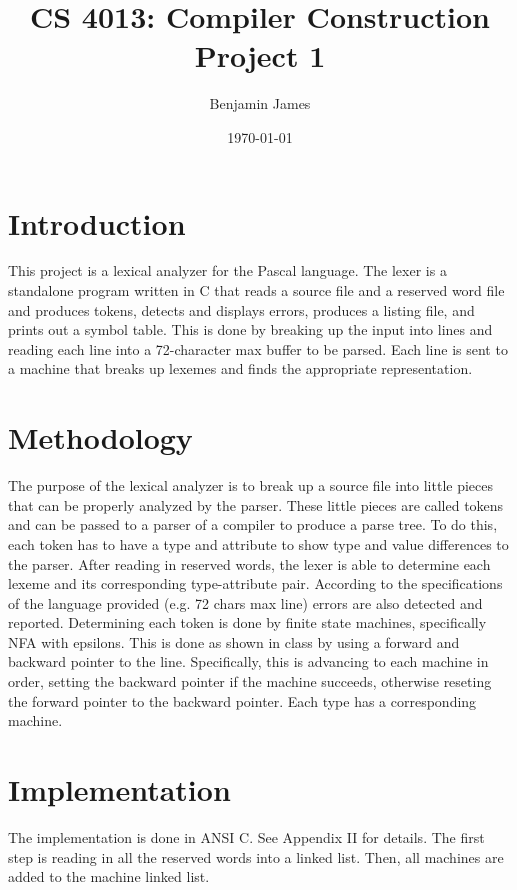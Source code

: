 \documentclass[titlepage]{article}
\author{Benjamin James}
\title{\textbf{CS 4013:  Compiler Construction \\ Project 1}}
\date{\today}
\begin{document}
\maketitle

\section*{Introduction}
This project is a lexical analyzer for the Pascal language. The lexer is a standalone program written in C that reads a source file and a reserved word file and produces tokens, detects and displays errors, produces a listing file, and prints out a symbol table. This is done by breaking up the input into lines and reading each line into a 72-character max buffer to be parsed. Each line is sent to a machine that breaks up lexemes and finds the appropriate representation.

\section*{Methodology}

The purpose of the lexical analyzer is to break up a source file into little pieces that can be properly analyzed by the parser. These little pieces are called tokens and can be passed to a parser of a compiler to produce a parse tree. To do this, each token has to have a type and attribute to show type and value differences to the parser. After reading in reserved words, the lexer is able to determine each lexeme and its corresponding type-attribute pair. According to the specifications of the language provided\cite{Aho86} (e.g. 72 chars max line) errors are also detected and reported. Determining each token is done by finite state machines, specifically NFA with epsilons. This is done as shown in class by using a forward and backward pointer to the line. Specifically, this is advancing to each machine in order, setting the backward pointer if the machine succeeds, otherwise reseting the forward pointer to the backward pointer. Each type has a corresponding machine.

\section*{Implementation}

The implementation is done in ANSI C.  See Appendix II for details. The first step is reading in all the reserved words into a linked list. Then, all machines are added to the machine linked list.
\end{document}
